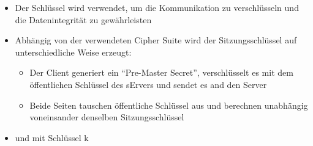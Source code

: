 \begin{infoBox}[title=TLS Handshake]
\begin{enumerate}
\begin{itemize}
            \item Der Schlüssel wird verwendet, um die Kommunikation zu verschlüsseln und die Datenintegrität zu gewährleisten
            \item Abhängig von der verwendeten Cipher Suite wird der Sitzungsschlüssel auf unterschiedliche Weise erzeugt:
            \begin{itemize}
                \item {} Der Client generiert ein \enquote{Pre-Master Secret}, verschlüsselt es mit dem öffentlichen Schlüssel des sErvers und sendet es and den Server
                \item {} Beide Seiten tauschen öffentliche Schlüssel aus und berechnen unabhängig voneinsander denselben Sitzungsschlüssel
            \end{itemize}
        \end{itemize}
    \end{enumerate}
\end{infoBox}
\begin{itemize}
    \item {} und  mit Schlüssel k
\end{itemize}
